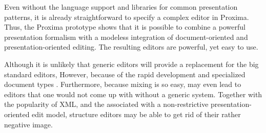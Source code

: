 Even without the language support and libraries for common presentation patterns, it is already straightforward to specify a complex editor in Proxima. Thus, the Proxima prototype shows that it is possible to combine a powerful presentation formalism with a modeless integration of document-oriented and presentation-oriented editing. The resulting editors are powerful, yet easy to use.

\bc
\toHere
Although it is unlikely that generic editors will provide a replacement for the big standard editors,  However, because of the rapid development and  specialized document types . Furthermore, because mixing is so easy, may even lead to editors that one would not come up with without a generic system. Together with the popularity of XML, and the associated with a non-restrictive presentation-oriented edit model, structure editors may be able to get rid of their rather negative image.
\ec





